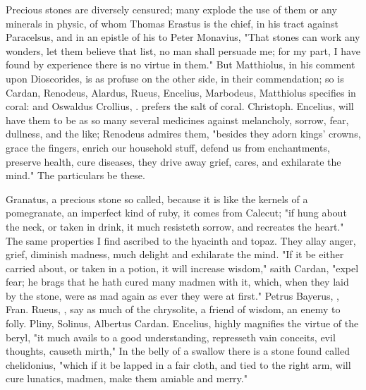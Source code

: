 {Precious stones are diversely censured; many explode the use of them or any minerals in physic, of whom Thomas Erastus is the chief, in his tract against Paracelsus, and in an epistle of his to Peter Monavius, "That stones can work any wonders, let them believe that list, no man shall persuade me; for my part, I have found by experience there is no virtue in them." But Matthiolus, in his comment upon Dioscorides, is as profuse on the other side, in their commendation; so is Cardan, Renodeus, Alardus, Rueus, Encelius, Marbodeus, \etc{} Matthiolus specifies in coral: and Oswaldus Crollius, . prefers the salt of coral. Christoph. Encelius,  will have them to be as so many several medicines against melancholy, sorrow, fear, dullness, and the like; Renodeus admires them, "besides they adorn kings' crowns, grace the fingers, enrich our household stuff, defend us from enchantments, preserve health, cure diseases, they drive away grief, cares, and exhilarate the mind." The particulars be these.

Granatus, a precious stone so called, because it is like the kernels of a pomegranate, an imperfect kind of ruby, it comes from Calecut; "if hung about the neck, or taken in drink, it much resisteth sorrow, and recreates the heart." The same properties I find ascribed to the hyacinth and topaz. They allay anger, grief, diminish madness, much delight and exhilarate the mind. "If it be either carried about, or taken in a potion, it will increase wisdom," saith Cardan, "expel fear; he brags that he hath cured many madmen with it, which, when they laid by the stone, were as mad again as ever they were at first." Petrus Bayerus, , Fran. Rueus, , say as much of the chrysolite, a friend of wisdom, an enemy to folly. Pliny,  Solinus,  Albertus  Cardan. Encelius,  highly magnifies the virtue of the beryl, "it much avails to a good understanding, represseth vain conceits, evil thoughts, causeth mirth," \etc{} In the belly of a swallow there is a stone found called chelidonius, "which if it be lapped in a fair cloth, and tied to the right arm, will cure lunatics, madmen, make them amiable and merry."

}
